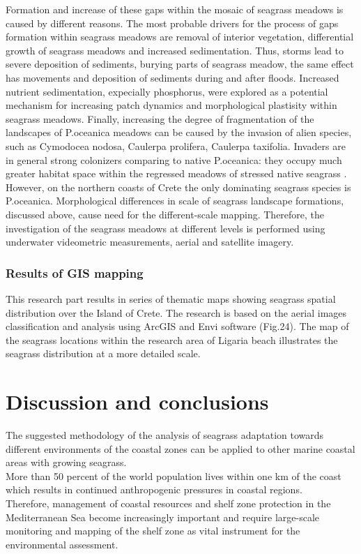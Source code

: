 \documentclass[10pt, a4paper]{article}
\begin{document}
Formation and increase of these
gaps within the mosaic of seagrass meadows is caused by different reasons. The most probable
drivers for the process of gaps formation within seagrass meadows are removal of interior vegetation,
differential growth of seagrass meadows and increased sedimentation. Thus, storms lead to severe
deposition of sediments, burying parts of seagrass meadow, the same effect has movements and
deposition of sediments during and after floods\cite{Bell99}\label{Bell99}.
Increased nutrient sedimentation, expecially phosphorus, were explored \cite{Jensen01}\label{Jensen01} as a
potential mechanism for increasing patch dynamics and morphological plastisity within seagrass
meadows. Finally, increasing the degree of fragmentation of the landscapes of P.oceanica meadows
can be caused by the invasion of alien species, such as Cymodocea nodosa, Caulerpa prolifera,
Caulerpa taxifolia. Invaders are in general strong colonizers comparing to native P.oceanica: they
occupy much greater habitat space within the regressed meadows of stressed native seagrass
\cite{Montefalcone10}\label{Montefalcone10}. However, on the northern coasts of Crete the only dominating seagrass
species is P.oceanica.
Morphological differences in scale of seagrass landscape formations, discussed above, cause need for
the different-scale mapping. Therefore, the investigation of the seagrass meadows at different levels is
performed using underwater videometric measurements, aerial and satellite imagery.

\pagebreak

\subsubsection{Results of GIS mapping}
This research part results in series of thematic maps showing seagrass spatial distribution over the Island of
Crete. The research is based on the aerial images classification and analysis using ArcGIS and Envi
software (Fig.24). The map of the seagrass locations within the research area of Ligaria beach illustrates the seagrass
distribution at a more detailed scale.

\pagebreak
\section{Discussion and conclusions}
The suggested methodology of the analysis of seagrass adaptation towards different environments of
the coastal zones can be applied to other marine coastal areas with growing seagrass.\\
More than 50 percent of the world population lives within one km of the coast which results in continued
anthropogenic pressures in coastal regions. \\Therefore, management of coastal resources and shelf
zone protection in the Mediterranean Sea become increasingly important and require large-scale
monitoring and mapping of the shelf zone as vital instrument for the environmental assessment.
\pagebreak
\end{document}
